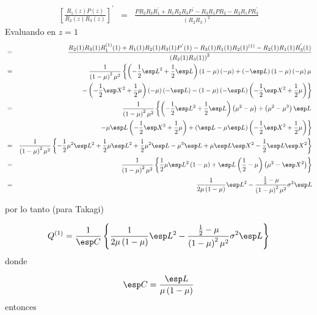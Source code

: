 \begin{eqnarray}\label{Eq.Primer.Derivada.Q}
\left[\frac{R_{1}\left(z\right)P\left(z\right)}{R_{2}\left(z\right)R_{3}\left(z\right)}\right]^{'}&=&\frac{PR_{2}R_{3}R_{1}^{'}
+R_{1}R_{2}R_{3}P^{'}-R_{3}R_{1}PR_{2}-R_{2}R_{1}PR_{3}^{'}}{\left(R_{2}R_{3}\right)^{2}}
\end{eqnarray}
Evaluando en $z=1$
\begin{eqnarray*}
&=&\frac{R_{2}(1)R_{3}(1)R_{1}^{(1)}(1)+R_{1}(1)R_{2}(1)R_{3}(1)P^{'}(1)-R_{3}(1)R_{1}(1)R_{2}(1)^{(1)}-R_{2}(1)R_{1}(1)R_{3}^{'}(1)}{\left(R_{2}(1)R_{3}(1)\right)^{2}}\\
&=&\frac{1}{\left(1-\mu\right)^{2}\mu^{2}}\left\{\left(-\frac{1}{2}\esp L^{2}+\frac{1}{2}\esp L\right)\left(1-\mu\right)\left(-\mu\right)+\left(-\esp L\right)\left(1-\mu\right)\left(-\mu\right)\mu\right.\\
&&\left.-\left(-\frac{1}{2}\esp X^{2}+\frac{1}{2}\mu\right)\left(-\mu\right)\left(-\esp L\right)-\left(1-\mu\right)\left(-\esp L\right)\left(-\frac{1}{2}\esp X^{2}+\frac{1}{2}\mu\right)\right\}\\
&=&\frac{1}{\left(1-\mu\right)^{2}\mu^{2}}\left\{\left(-\frac{1}{2}\esp L^{2}+\frac{1}{2}\esp L\right)\left(\mu^{2}-\mu\right)
+\left(\mu^{2}-\mu^{3}\right)\esp L\right.\\
&&\left.-\mu\esp L\left(-\frac{1}{2}\esp X^{2}+\frac{1}{2}\mu\right)
+\left(\esp L-\mu\esp L\right)\left(-\frac{1}{2}\esp X^{2}+\frac{1}{2}\mu\right)\right\}\\
&=&\frac{1}{\left(1-\mu\right)^{2}\mu^{2}}\left\{-\frac{1}{2}\mu^{2}\esp L^{2}
+\frac{1}{2}\mu\esp L^{2}
+\frac{1}{2}\mu^{2}\esp L
-\mu^{3}\esp L
+\mu\esp L\esp X^{2}
-\frac{1}{2}\esp L\esp X^{2}\right\}\\
&=&\frac{1}{\left(1-\mu\right)^{2}\mu^{2}}\left\{
\frac{1}{2}\mu\esp L^{2}\left(1-\mu\right)
+\esp L\left(\frac{1}{2}-\mu\right)\left(\mu^{2}-\esp X^{2}\right)\right\}\\
&=&\frac{1}{2\mu\left(1-\mu\right)}\esp L^{2}-\frac{\frac{1}{2}-\mu}{\left(1-\mu\right)^{2}\mu^{2}}\sigma^{2}\esp L
\end{eqnarray*}

por lo tanto (para Takagi)

\begin{eqnarray*}
Q^{(1)}=\frac{1}{\esp C}\left\{\frac{1}{2\mu\left(1-\mu\right)}\esp L^{2}-\frac{\frac{1}{2}-\mu}{\left(1-\mu\right)^{2}\mu^{2}}\sigma^{2}\esp L\right\}
\end{eqnarray*}
donde 

\begin{eqnarray*}
\esp C = \frac{\esp L}{\mu\left(1-\mu\right)}
\end{eqnarray*}
entonces


